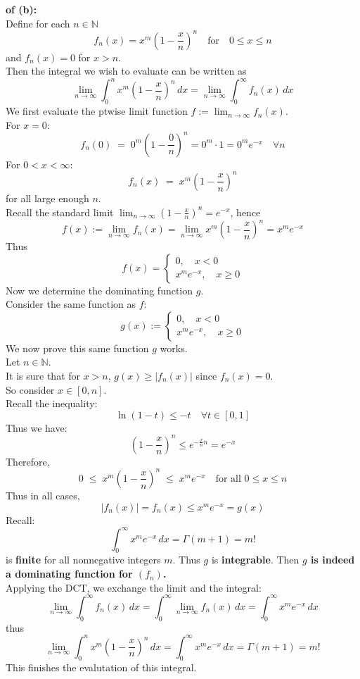 \documentclass[lang=cn,11pt]{elegantbook}
\begin{document}
\begin{solution}
    \textbf{of (b):}\\
Define for each $n \in \mathbb{N}$ \[
f_n(x) = x^m \left(1 - \frac{x}{n}\right)^n 
\quad \text{for} \quad 0 \le x \le n
\]
and $f_n(x) = 0$ for $x > n$.\\
Then the integral we wish to evaluate can be written as \[
 \lim_{n\to \infty} \int_0^n x^m \left(1 - \frac{x}{n}\right)^n \, dx  = \lim_{n\to \infty} 
\int_0^\infty f_n(x) \, dx
\]
We first evaluate the ptwise limit function $f:= \lim_{n\to \infty} f_n(x)$.\\
For \(x = 0\): \[
   f_n(0) \;=\; 0^m \left(1 - \frac{0}{n}\right)^n = 0^m \cdot 1 =0^m e^{-x} \quad \forall n
   \]
For \(0 < x < \infty\): \[
   f_n(x) \;=\; x^m \left(1 - \frac{x}{n}\right)^n
   \]
for all large enough $n$. \\
Recall the standard limit \(\lim_{n \to \infty} \left(1 - \tfrac{x}{n}\right)^n = e^{-x}\), hence \[
  f(x) := \lim_{n \to \infty} f_n(x) = \lim_{n \to \infty}   x^m \left(1 - \frac{x}{n}\right)^n = 
   x^m e^{-x}
   \]
Thus \[
f(x) = \begin{cases}
    0, \quad x< 0 \\
       x^m e^{-x}, \quad x \geq 0
\end{cases}
\]
Now we determine the dominating function $g$.\\
Consider the same function as $f$:
\[
g(x) :=  \begin{cases}
    0,\quad x< 0\\
    x^m  e^{-x}, \quad x\geq 0
\end{cases}
\]
We now prove this same function $g$ works.\\
Let $n \in \mathbb{N}$.\\
It is sure that for $x > n$, $g(x) \geq |f_n(x)|$ since $f_n(x) = 0$.\\
So consider $x\in[0,n]$.\\
Recall the inequality: \[ \ln(1-t)\le -t \quad \forall t\in[0,1]\]
Thus we have: 
\[
\left(1 - \frac{x}{n}\right)^n \leq
e^{-\frac{x}{n}n} =
e^{-x}
\]
Therefore,
\[
0 
\;\le\;
x^m \left(1 - \frac{x}{n}\right)^n 
\;\le\;
x^m e^{-x}
\quad
\text{for all } 0 \le x \le n
\]
Thus in all cases,
\[|f_n(x)|=f_n(x) \leq 
x^m e^{-x} =
g(x)
\]
Recall:
\[
\int_0^\infty x^m e^{-x}\,dx = \Gamma(m+1) = m!
\]
is \textbf{finite} for all nonnegative integers \(m\). Thus \(g\) is \textbf{integrable}. Then \textbf{$g$ is indeed a dominating function for $(f_n)$.} \\
Applying the DCT, we exchange the limit and the integral:
\[
\lim_{n \to \infty} \int_0^\infty f_n(x)\, dx =
\int_0^\infty \lim_{n\to\infty} f_n(x)\, dx =
\int_0^\infty x^m e^{-x}\, dx
\] thus
\[
\lim_{n \to \infty} \int_0^n x^m \left(1 - \frac{x}{n}\right)^n \, dx =
\int_0^\infty x^m e^{-x}\, dx = \Gamma(m+1) = m!
\] This finishes the evalutation of this integral.
\end{solution}
\end{document}
